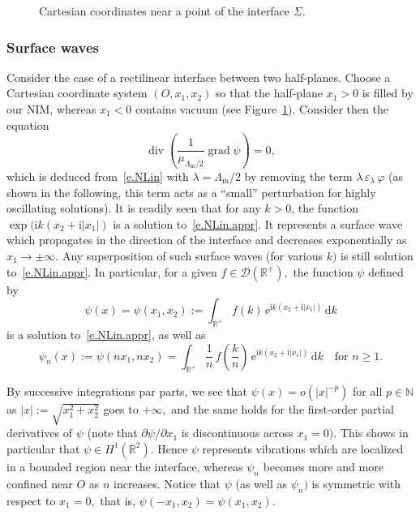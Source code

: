 \documentclass[AHL,Unicode,longabstracts]{cedram}
\DeclareMathOperator{\Div}{div}
\DeclareMathOperator{\grad}{grad}
\newcommand{\epsl}{\varepsilon}
\newcommand{\calD}{\mathcal{D}}
\newcommand{\bbN}{\mathbb{N}}
\newcommand{\bbR}{\mathbb{R}}
\newcommand{\rmd}{{\mathrm{d}}}
\newcommand{\rme}{{\mathrm{e}}}
\newcommand{\rmi}{{\mathrm{i}}}
\newcommand{\Lm}{{\Lambda_{\mathrm{m}}}}
\begin{document}
\begin{figure}[!t]
\begin{center}
\end{center}
\caption{Cartesian coordinates near a point of the interface $\Sigma.$}\label{f.surf-res}
\end{figure}

\subsubsection{Surface waves}
Consider the case of a rectilinear interface between two half-planes. Choose a Cartesian coordinate system $(O,x_1,x_2)$ so that the half-plane $x_1 > 0$ is filled by our NIM, whereas $x_1 < 0$ contains vacuum (see Figure~\ref{f.surf-res}). Consider then the equation
\begin{equation}\label{e.NLin.appr}
\Div \left(\frac{1}{\mu_{\Lm/2}} \grad \psi \right) = 0,
\end{equation}
which is deduced from~\eqref{e.NLin} with $\lambda = \Lm/2$ by removing the term $\lambda\,\epsl_\lambda\,\varphi$ (as shown in the following, this term acts as a ``small'' perturbation for highly oscillating solutions). It is readily seen that for any $k>0$, the function $\exp(\rmi k(x_2 + \rmi |x_1|)$ is a solution to~\eqref{e.NLin.appr}. It represents a surface wave which propagates in the direction of the interface and decreases exponentially as $x_1 \to \pm\infty.$ Any superposition of such surface waves (for various $k)$ is still solution to~\eqref{e.NLin.appr}. In particular, for a given $f \in \calD(\bbR^+),$ the function $\psi$ defined by
\[
\psi(x) = \psi(x_1,x_2) :=
\int_{\bbR^+} f(k)\,\rme^{\rmi k(x_2 + \rmi |x_1|)}\, \rmd k
\]
is a solution to~\eqref{e.NLin.appr}, as well as
\[
\psi_n(x) := \psi(nx_1,nx_2) =
\int_{\bbR^+} \frac{1}{n}\,f\left(\frac{k}{n}\right)\,\rme^{\rmi k(x_2 + \rmi |x_1|)}\, \rmd k
\quad\text{for }n \geq 1.
\]

\begin{rema}\label{r.surf-res}
By successive integrations par parts, we see that $\psi(x) = o(|x|^{-p})$ for all $p \in \bbN$ as $|x| := \sqrt{x_1^2 + x_2^2}$ goes to $+\infty,$ and the same holds for the first-order partial derivatives of $\psi$ (note that $\partial\psi/\partial x_1$ is discontinuous across $x_1=0).$ This shows in particular that $\psi \in H^1(\bbR^2).$ Hence $\psi$ represents vibrations which are localized in a bounded region near the interface, whereas $\psi_n$ becomes more and more confined near $O$ as $n$ increases. Notice that $\psi$ (as well as $\psi_n)$ is symmetric with respect to $x_1=0,$ that is, $\psi(-x_1,x_2) = \psi(x_1,x_2).$
\end{rema}
\end{document}
